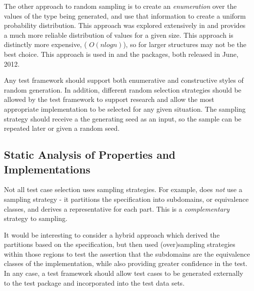 The other approach to random sampling is to create an \emph{enumeration}
over the values of the type being generated,
and use that information to create a uniform probability distribution.
This approach was explored extensively in \cite{FlajoletZC94,FlSa95}
and provides a much more reliable distribution of values for a given size.
This approach is distinctly more expensive, ( $O (n log n)$),
so for larger structures may not be the best choice.
This approach is used in \FEAT and the \GC packages,
both released in June, 2012.


Any test framework should support both enumerative and constructive styles of random generation.
In addition, different random selection strategies should be allowed by 
the test framework to support research and
allow the most appropriate implementation to be selected for any given situation.
The sampling strategy should receive a the generating seed as an input,
so the sample can be repeated later or given a random seed.


\subsection{Static Analysis of Properties and Implementations}

Not all test case selection uses sampling strategies.
For example, \HOLTG does \emph{not} use a sampling strategy -
it partitions the specification into subdomains, or equivalence classes,
and derives a representative for each part.
This is a \emph{complementary} strategy to sampling.

It would be interesting to consider a hybrid approach which
derived the partitions based on the specification,
but then used (over)sampling strategies within those regions to
test the assertion that the subdomains are the equivalence classes of
the implementation, while also providing greater confidence in the test.
In any case, a test framework should allow test cases to be generated
externally to the test package and incorporated into the test data sets.

